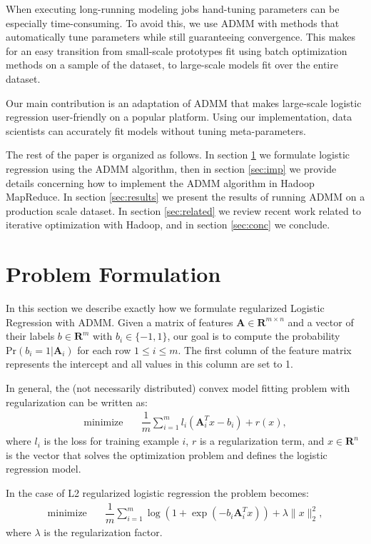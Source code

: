 \documentclass[10pt, conference, compsocconf]{IEEEtran}
\begin{document}
When executing long-running modeling jobs hand-tuning parameters can be especially time-consuming.  To avoid this, we use ADMM with methods that automatically tune parameters while still guaranteeing convergence.  This makes for an easy transition from small-scale prototypes fit using batch optimization methods on a sample of the dataset, to large-scale models fit over the entire dataset.

Our main contribution is an adaptation of ADMM that makes large-scale logistic regression user-friendly on a popular platform.  Using our implementation, data scientists can accurately fit models without tuning meta-parameters.

The rest of the paper is organized as follows.  In section \ref{sec:prob} we formulate logistic regression using the ADMM algorithm, then in section \ref{sec:imp} we provide details concerning how to implement the ADMM algorithm in Hadoop MapReduce.  In section \ref{sec:results} we present the results of running ADMM on a production scale dataset.  In section \ref{sec:related} we review recent work related to iterative optimization with Hadoop, and in section \ref{sec:conc} we conclude.

\section{Problem Formulation}\label{sec:prob}

In this section we describe exactly how we formulate regularized Logistic Regression with ADMM. Given a matrix of features $\mathbf{A}\in\mathbf{R}^{m\times n}$ and a vector of their labels $b\in\mathbf{R}^m$ with $b_i\in\{-1,1\}$, our goal is to compute the probability $\text{Pr}(b_i=1|\mathbf{A}_i)$ for each row $1\leq i\leq m$.  The first column of the feature matrix represents the intercept and all values in this column are set to 1.

In general, the (not necessarily distributed) convex model fitting problem with regularization can be written as:
\begin{align*}
\text{minimize}&\quad \dfrac{1}{m}\sum_{i=1}^m l_i(\mathbf{A}_i^Tx - b_i) + r(x),
\end{align*}
where $l_i$ is the loss for training example $i$, $r$ is a regularization term, and $x\in\mathbf{R}^n$ is the vector that solves the optimization problem and defines the logistic regression model.

In the case of L2 regularized logistic regression the problem becomes:
\begin{align*}
\text{minimize}&\quad \dfrac{1}{m}\sum_{i=1}^m \log(1 + \exp(-b_i\mathbf{A}_i^Tx)) + \lambda\|x\|_2^2,
\end{align*}
where $\lambda$ is the regularization factor.
\end{document}
